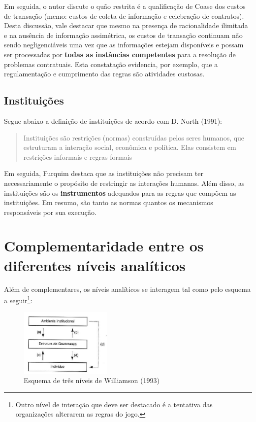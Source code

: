 \documentclass[9pt,twocolumn,twoside,lineno]{style}
\begin{document}
Em seguida, o autor discute o quão restrita é a qualificação de Coase dos custos de transação (memo: custos de coleta de informação e celebração de contratos). Desta discussão, vale destacar que mesmo na presença de racionalidade ilimitada e na ausência de informação assimétrica, os custos de transação continuam não sendo negligenciáveis uma vez que as informações estejam disponíveis e possam ser processadas por \textbf{todas as instâncias competentes} para a resolução de problemas contratuais. Esta constatação evidencia, por exemplo, que a regulamentação e cumprimento das regras são atividades custosas.

\subsection{Instituições}

Segue abaixo a definição de instituições de acordo com D. North (1991):

\begin{quote}
	Instituições são
	restrições (normas) construídas pelos seres humanos, que estruturam a interação social, econômica e política. Elas consistem em restrições informais e regras formais 
\end{quote}
Em seguida, Furquim destaca que as instituições não precisam ter necessariamente o propósito de restringir as interações humanas. Além disso, as instituições são os \textbf{instrumentos} adequados para as regras que compõem as instituições. Em resumo, são tanto as normas quantos os mecanismos responsáveis por sua execução.

\section{Complementaridade entre os diferentes níveis analíticos}

Além de complementares, os níveis analíticos se interagem tal como pelo esquema a seguir\footnote{Outro nível de interação que deve ser destacado é a tentativa das organizações alterarem as regras do jogo.}:

\begin{figure}[H]
	\centering
	\caption{Esquema de três níveis de Williamson (1993)}
	\label{fig:screenshot001}
	\includegraphics[width=0.4\textwidth]{figs/screenshot001}
\end{figure}
\end{document}
